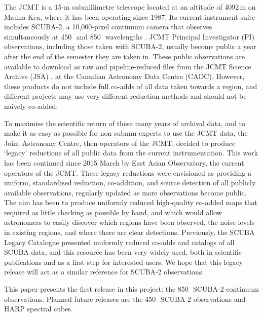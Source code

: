 \documentclass[twocolumn,times]{aastex6}
\newcommand{\um}{\micron}
\begin{document}
The JCMT is a 15-m submillimetre telescope located at an altitude of
4092\,m on Mauna Kea, where it has been operating since 1987. Its
current instrument suite includes SCUBA-2, a 10,000-pixel continuum
camera that observes simultaneously at 450\,\um\ and 850\,\um\
wavelengths \citep{Holland2013}.  JCMT Principal Investigator (PI)
observations, including
those taken with SCUBA-2, usually become public a year after the end
of the semester they are taken in. These public observations are
available to download as raw and pipeline-reduced files from the
JCMT Science Archive (JSA) \citep{2015Economou}, at the Canadian
Astronomy Data Centre (CADC). However, these products do not include
full co-adds of all data taken towards a region, and different projects
may use very different reduction methods and should not be
naively co-added.

To maximise the scientific return of these many years of archival
data, and to make it as easy as possible for non-submm-experts to use
the JCMT data, the Joint Astronomy Centre, then-operators of the JCMT,
decided to produce `legacy' reductions of all public data from the
current instrumentation. This work has been continued since 2015 March
by East Asian Observatory, the current operators of the JCMT. These
legacy reductions were envisioned as providing a uniform, standardised
reduction, co-addition, and source detection of all publicly available
observations, regularly updated as more observations become
public. The aim has been to produce uniformly reduced high-quality
co-added maps that required as little checking as possible by hand,
and which would allow astronomers to easily discover which regions
have been observed, the noise levels in existing regions, and where
there are clear detections. Previously, the SCUBA Legacy Catalogue
\citep{DiFrancesco2008} presented uniformly reduced co-adds and
catalogs of all SCUBA data, and this resource has been very widely
used, both in scientific publications and as a first step for
interested users. We hope that this legacy release will act as a similar
reference for SCUBA-2 observations.

This paper presents the first release in this project: the 850\,\um\
SCUBA-2 continuum observations. Planned future releases are the
450\,\um\ SCUBA-2 observations and HARP spectral cubes.


\end{document}
